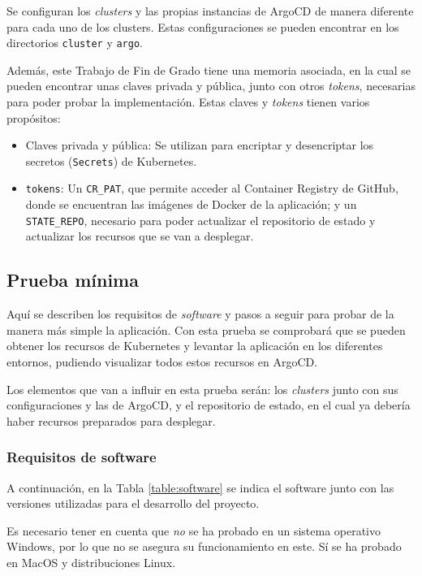Se configuran los \textit{clusters} y las propias instancias de ArgoCD de manera diferente para cada uno de los clusters. Estas configuraciones se pueden encontrar en los directorios \texttt{cluster} y \texttt{argo}.

Además, este Trabajo de Fin de Grado tiene una memoria asociada, en la cual se pueden encontrar unas claves privada y pública, junto con otros \textit{tokens}, necesarias para poder probar la implementación. Estas claves y \textit{tokens} tienen varios propósitos:

\begin{itemize}
  \item Claves privada y pública: Se utilizan para encriptar y desencriptar los secretos (\texttt{Secrets}) de Kubernetes.
  \item \texttt{tokens}: Un \texttt{CR\_PAT}, que permite acceder al Container Registry de GitHub, donde se encuentran las imágenes de Docker de la aplicación; y un \texttt{STATE\_REPO}, necesario para poder actualizar el repositorio de estado y actualizar los recursos que se van a desplegar.
\end{itemize}

\subsection*{Prueba mínima}

Aquí se describen los requisitos de \textit{software} y pasos a seguir para probar de la manera más simple la aplicación. Con esta prueba se comprobará que se pueden obtener los recursos de Kubernetes y levantar la aplicación en los diferentes entornos, pudiendo visualizar todos estos recursos en ArgoCD.

Los elementos que van a influir en esta prueba serán: los \textit{clusters} junto con sus configuraciones y las de ArgoCD, y el repositorio de estado, en el cual ya debería haber recursos preparados para desplegar.

\subsubsection*{Requisitos de software}

A continuación, en la Tabla \ref{table:software} se indica el software junto con las versiones utilizadas para el desarrollo del proyecto.

Es necesario tener en cuenta que \textit{no} se ha probado en un sistema operativo Windows, por lo que no se asegura su funcionamiento en este. Sí se ha probado en MacOS y distribuciones Linux.


